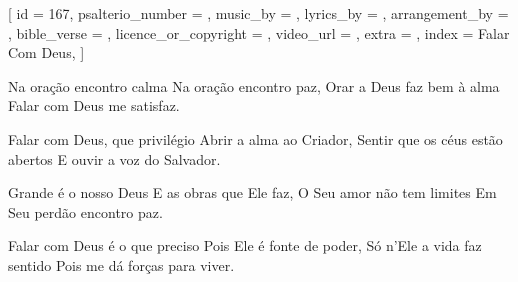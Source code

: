 
[
    id                     = {167},
    psalterio_number       = {},
    music_by               = {},
    lyrics_by              = {},
    arrangement_by         = {},
    bible_verse            = {},
    licence_or_copyright   = {},
    video_url              = {},
    extra                  = {},
    index                  = {Falar Com Deus},
]


\beginverse

Na oração encontro calma
Na oração encontro paz,
Orar a Deus faz bem à alma
Falar com Deus me satisfaz.

\endverse


\beginverse

Falar com Deus, que privilégio
Abrir a alma ao Criador,
Sentir que os céus estão abertos
E ouvir a voz do Salvador.

\endverse


\beginchorus

Grande é o nosso Deus
E as obras que Ele faz,
O Seu amor não tem limites
Em Seu perdão encontro paz.

\endchorus


\beginverse

Falar com Deus é o que preciso
Pois Ele é fonte de poder,
Só n’Ele a vida faz sentido
Pois me dá forças para viver.

\endverse



\endsong
